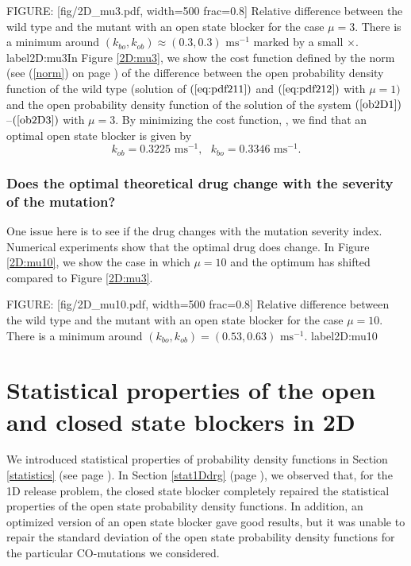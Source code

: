 {FIGURE: [fig/2D_mu3.pdf, width=500 frac=0.8] Relative difference  between the wild type and the mutant with 
an open state blocker for the case $\mu=3$. There is a minimum around $(k_{bo},k_{ob})\approx(0.3,0.3)\text{ ms}^{-1}$ marked by a small $\times$. label{2D:mu3}In Figure \ref{2D:mu3}, we show the cost function defined by the norm (see
(\ref{norm}) on page \pageref{norm}) of the difference between the open probability density function of
the wild type (solution of $(\ref{eq:pdf211})$ and $(\ref{eq:pdf212})$ with $\mu=1)$
and the open probability density function of the solution of the system 
$(\ref{ob2D1})$--$(\ref{ob2D3})$ with $\mu=3.$ By minimizing the cost function,
,
we find that an optimal open state blocker is given by
\begin{equation}
k_{ob}=0.3225\text{ ms}^{-1}, \text{  } k_{bo}=0.3346\text{ ms}^{-1}. \label{optob2D}
\end{equation}

\subsubsection{Does the optimal theoretical drug change with the severity of the mutation?}
One issue here is to see if the drug changes with the mutation severity
index. Numerical experiments show that 
the optimal drug does change. In Figure \ref{2D:mu10}, we show the case in which $\mu=10$ and the optimum has shifted compared to  Figure \ref{2D:mu3}.

FIGURE: [fig/2D_mu10.pdf, width=500 frac=0.8] Relative difference between the wild type and the mutant with 
an open state blocker for the case $\mu=10$. There is a minimum around $(k_{bo},k_{ob})=(0.53,0.63)\text{ ms}^{-1}$. label{2D:mu10}
\section[Statistical properties of blockers in 2D]{Statistical properties of the open and closed state blockers in 2D}

We introduced statistical properties of probability density functions in Section \ref{statistics} (see page \pageref{statistics}). In Section \ref{stat1Ddrg} (page \pageref{stat1Ddrg}), we observed that, for the 1D release problem, the closed state blocker completely repaired the statistical properties of the open state probability density functions. In addition, an optimized version of an open state blocker gave good results, but it was unable to repair the standard deviation of the open state probability density functions
for the particular CO-mutations we considered.

}
